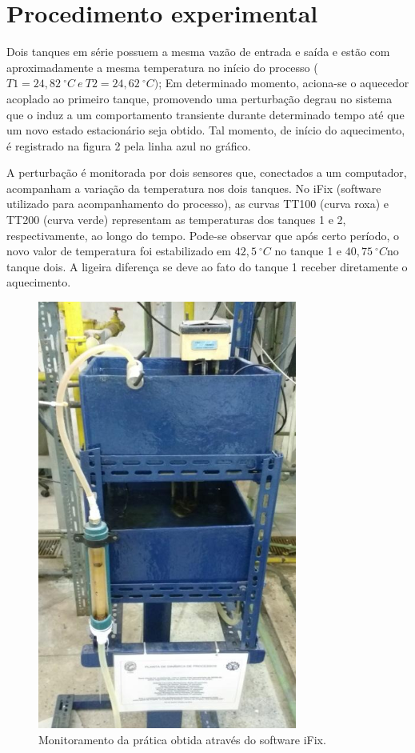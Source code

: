 \section{Procedimento experimental}

Dois tanques em série possuem a mesma vazão de entrada e saída e estão com aproximadamente a mesma temperatura no início do processo ($ T1 = 24,82 \  ^{\circ}C \  e \ T2 =24,62 \ ^{\circ}C) $; Em determinado momento, aciona-se o aquecedor acoplado ao primeiro tanque, promovendo uma perturbação degrau no sistema que o induz a um comportamento transiente durante determinado tempo até que um novo estado estacionário seja obtido. Tal momento, de início do aquecimento, é registrado na figura 2 pela linha azul no gráfico. 

A perturbação é monitorada por dois sensores que, conectados a um computador, acompanham a variação da temperatura nos dois tanques. No iFix (software utilizado para acompanhamento do processo), as curvas TT100 (curva roxa) e TT200 (curva verde) representam as temperaturas dos tanques 1 e 2, respectivamente, ao longo do tempo. Pode-se observar que após certo período, o novo valor de temperatura foi estabilizado em $ 42,5 \ ^{\circ}C $ no tanque 1 e $ 40,75 \ ^{\circ}C  $no tanque dois. A ligeira diferença se deve ao fato do tanque 1 receber diretamente o aquecimento.


\begin{figure}[H]
	\begin{center}
		\includegraphics[scale=.8, trim={0 0 0 0}]{figuras/ladeq/dina/ft1}
		\caption{Monitoramento da prática obtida através do software iFix.}
		\label{iFix}
	\end{center}
\end{figure}


